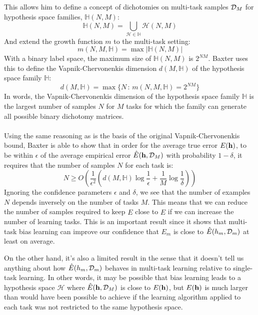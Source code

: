 This allows him to define a concept of dichotomies on multi-task samples $\mathcal{D}_M$ for hypothesis space families, $\mathbb{H}(N, M)$:
$$
\mathbb{H}(N, M) = \bigcup\limits_{\mathcal{H} \in \mathbb{H}} \mathcal{H}(N, M)
$$
And extend the growth function $m$ to the multi-task setting:
$$
m(N, M, \mathbb{H}) = \max|\mathbb{H}(N, M)|
$$
With a binary label space, the maximum size of $\mathbb{H}(N, M)$ is $2^{NM}$. Baxter uses this to define the Vapnik-Chervonenkis dimension $d(M, \mathbb{H})$ of the hypothesis space family $\mathbb{H}$:
$$
d(M, \mathbb{H}) = \max\{N\, : \, m(N, M, \mathbb{H}) = 2^{NM}\}
$$
In words, the Vapnik-Chervonenkis dimension of the hypothesis space family $\mathbb{H}$ is the largest number of samples $N$ for $M$ tasks for which the family can generate all possible binary dichotomy matrices.
\\\\
Using the same reasoning as is the basis of the original Vapnik-Chervonenkis bound, Baxter is able to show that in order for the average true error $E(\mathbf{h})$, to be within $\epsilon$ of the average empirical error $\hat{E}(\mathbf{h}, \mathcal{D}_M)$ with probability $1 - \delta$, it requires that the number of samples $N$ for each task is:
$$
N \geq O\left(\frac{1}{\epsilon^2}\left(d(M, \mathbb{H}) \log \frac{1}{\epsilon} + \frac{1}{M} \log \frac{1}{\delta}\right)\right)
$$
Ignoring the confidence parameters $\epsilon$ and $\delta$, we see that the number of examples $N$ depends inversely on the number of tasks $M$. This means that we can reduce the number of samples required to keep $E$ close to $\hat{E}$ if we can increase the number of learning tasks. This is an important result since it shows that multi-task bias learning can improve our confidence that $E_m$ is close to $\hat{E}(h_m, \mathcal{D}_m)$ at least on average. 

On the other hand, it's also a limited result in the sense that it doesn't tell us anything about how $\hat{E}(h_m, \mathcal{D}_m)$ behaves in multi-task learning relative to single-task learning. In other words, it may be possible that bias learning leads to a hypothesis space $\mathcal{H}$ where $\hat{E}(\mathbf{h}, \mathcal{D}_M)$ is close to $E(\mathbf{h})$, but $E(\mathbf{h})$ is much larger than would have been possible to achieve if the learning algorithm applied to each task was not restricted to the same hypothesis space.